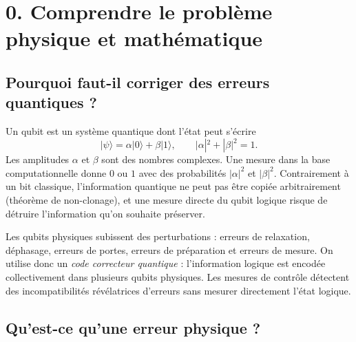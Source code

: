 \documentclass[11pt,a4paper]{article}
\begin{document}
\section{0. Comprendre le problème physique et mathématique}

\subsection{Pourquoi faut-il corriger des erreurs quantiques ?}

Un qubit est un système quantique dont l'état peut s'écrire
\[
  |\psi\rangle = \alpha |0\rangle+\beta |1\rangle,
  \qquad |\alpha|^2+|\beta|^2=1.
\]
Les amplitudes $\alpha$ et $\beta$ sont des nombres complexes. Une mesure
dans la base computationnelle donne $0$ ou $1$ avec des probabilités
$|\alpha|^2$ et $|\beta|^2$. Contrairement à un bit classique, l'information
quantique ne peut pas être copiée arbitrairement (théorème de non-clonage),
et une mesure directe du qubit logique risque de détruire l'information
qu'on souhaite préserver.

Les qubits physiques subissent des perturbations : erreurs de relaxation,
déphasage, erreurs de portes, erreurs de préparation et erreurs de mesure.
On utilise donc un \emph{code correcteur quantique} : l'information logique
est encodée collectivement dans plusieurs qubits physiques. Les mesures de
contrôle détectent des incompatibilités révélatrices d'erreurs sans mesurer
directement l'état logique.

\subsection{Qu'est-ce qu'une erreur physique ?}
\end{document}
